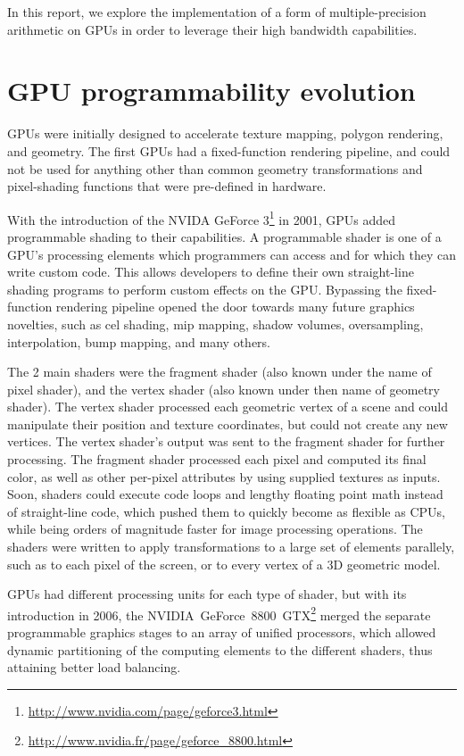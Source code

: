 \documentclass[12pt, a4paper]{report}
\begin{document}
\begin{sloppypar}
In this report, we explore the implementation of a form of multiple-precision
arithmetic on GPUs in order to leverage their high bandwidth capabilities.

\section{GPU programmability evolution}
GPUs were initially designed to accelerate texture mapping, polygon rendering,
and geometry.
The first GPUs had a fixed-function rendering pipeline, and could not be used
for anything other than common geometry transformations and pixel-shading
functions that were pre-defined in hardware.

With the introduction of the NVIDA GeForce
3\footnote{\url{http://www.nvidia.com/page/geforce3.html}} in 2001, GPUs added
programmable shading to their capabilities.
A programmable shader is one of a GPU's processing elements which programmers can access and for which they can write custom code.
This allows developers to define
their own straight-line shading programs to perform custom effects on the GPU.
Bypassing the fixed-function rendering pipeline opened the door towards many
future graphics novelties, such as cel shading, mip mapping, shadow volumes,
oversampling, interpolation, bump mapping, and many others.

The 2 main shaders were the fragment shader (also known under the name of pixel
shader), and the vertex shader (also known under then name of geometry shader).
The vertex shader processed each geometric vertex of a scene and could
manipulate their position and texture coordinates, but could not create any new
vertices.
The vertex shader's output was sent to the fragment shader for further
processing.
The fragment shader processed each pixel and computed its final color, as well
as other per-pixel attributes by using supplied textures as inputs.
Soon, shaders could execute code loops and lengthy floating point math instead
of straight-line code, which pushed them to quickly become as flexible as CPUs,
while being orders of magnitude faster for image processing operations.
The shaders were written to apply transformations to a large set of elements
parallely, such as to each pixel of the screen, or to every vertex of a 3D
geometric model.

GPUs had different processing units for each type of shader, but with its
introduction in 2006, the NVIDIA~GeForce~8800~GTX\footnote{\url{http://www.nvidia.fr/page/geforce_8800.html}} merged the separate
programmable graphics stages to an array of unified processors, which allowed
dynamic partitioning of the computing elements to the different shaders, thus
attaining better load balancing.


\end{sloppypar}
\end{document}
